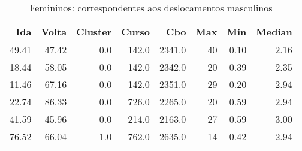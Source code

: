 \begin{table}
\centering
\caption{Femininos: correspondentes aos deslocamentos masculinos}
\label{tab:Salarios_Desequlibrio_F}
\begin{tabular}{rrrrrrrr}
\toprule
  Ida &  Volta &  Cluster &  Curso &    Cbo &  Max &  Min &  Median \\
\midrule
49.41 &  47.42 &      0.0 &  142.0 & 2341.0 &   40 & 0.10 &    2.16 \\
18.44 &  58.05 &      0.0 &  142.0 & 2342.0 &   20 & 0.39 &    2.35 \\
11.46 &  67.16 &      0.0 &  142.0 & 2351.0 &   29 & 0.20 &    2.94 \\
22.74 &  86.33 &      0.0 &  726.0 & 2265.0 &   20 & 0.59 &    2.94 \\
41.59 &  45.96 &      0.0 &  214.0 & 2163.0 &   27 & 0.59 &    3.00 \\
76.52 &  66.04 &      1.0 &  762.0 & 2635.0 &   14 & 0.42 &    2.94 \\
\bottomrule
\end{tabular}
\end{table}
